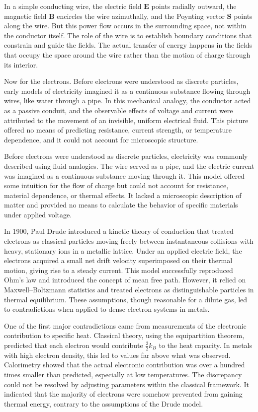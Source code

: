 In a simple conducting wire, the electric field $\mathbf{E}$ points radially outward, the magnetic field $\mathbf{B}$ encircles the wire azimuthally, and the Poynting vector $\mathbf{S}$ points along the wire. But this power flow occurs in the surrounding space, not within the conductor itself. The role of the wire is to establish boundary conditions that constrain and guide the fields. The actual transfer of energy happens in the fields that occupy the space around the wire rather than the motion of charge through its interior.

Now for the electrons. Before electrons were understood as discrete particles, early models of electricity imagined it as a continuous substance flowing through wires, like water through a pipe. In this mechanical analogy, the conductor acted as a passive conduit, and the observable effects of voltage and current were attributed to the movement of an invisible, uniform electrical fluid. This picture offered no means of predicting resistance, current strength, or temperature dependence, and it could not account for microscopic structure.

Before electrons were understood as discrete particles, electricity was commonly described using fluid analogies. The wire served as a pipe, and the electric current was imagined as a continuous substance moving through it. This model offered some intuition for the flow of charge but could not account for resistance, material dependence, or thermal effects. It lacked a microscopic description of matter and provided no means to calculate the behavior of specific materials under applied voltage.

In 1900, Paul Drude introduced a kinetic theory of conduction that treated electrons as classical particles moving freely between instantaneous collisions with heavy, stationary ions in a metallic lattice. Under an applied electric field, the electrons acquired a small net drift velocity superimposed on their thermal motion, giving rise to a steady current. This model successfully reproduced Ohm's law and introduced the concept of mean free path. However, it relied on Maxwell–Boltzmann statistics and treated electrons as distinguishable particles in thermal equilibrium. These assumptions, though reasonable for a dilute gas, led to contradictions when applied to dense electron systems in metals.

One of the first major contradictions came from measurements of the electronic contribution to specific heat. Classical theory, using the equipartition theorem, predicted that each electron would contribute $\tfrac{3}{2}k_B$ to the heat capacity. In metals with high electron density, this led to values far above what was observed. Calorimetry showed that the actual electronic contribution was over a hundred times smaller than predicted, especially at low temperatures. The discrepancy could not be resolved by adjusting parameters within the classical framework. It indicated that the majority of electrons were somehow prevented from gaining thermal energy, contrary to the assumptions of the Drude model.

